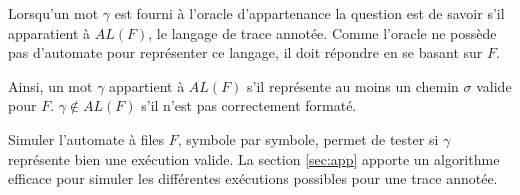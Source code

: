Lorsqu'un mot $\gamma$ est fourni à l'oracle d'appartenance la question est de savoir s'il apparatient à $AL(F)$, le langage de trace annotée. Comme l'oracle ne possède pas d'automate pour représenter ce langage, il doit répondre en se basant sur $F$.

Ainsi, un mot $\gamma$ appartient à $AL(F)$ s'il représente au moins un chemin $\sigma$ valide pour $F$. $\gamma\notin AL(F)$ s'il n'est pas correctement formaté.

Simuler l'automate à files $F$, symbole par symbole, permet de tester si $\gamma$ représente bien une exécution valide. La section \ref{sec:app} apporte un algorithme efficace pour simuler les différentes exécutions possibles pour une trace annotée.
